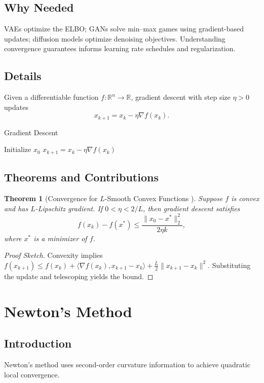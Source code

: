 \documentclass[11pt]{book}
\newtheorem{theorem}{Theorem}[chapter]
\begin{document}
\subsection{Why Needed}
VAEs optimize the ELBO; GANs solve min--max games using gradient-based updates; diffusion models optimize denoising objectives. Understanding convergence guarantees informs learning rate schedules and regularization.

\subsection{Details}
Given a differentiable function $f: \mathbb{R}^n \to \mathbb{R}$, gradient descent with step size $\eta>0$ updates
\begin{equation}
x_{k+1} = x_k - \eta \nabla f(x_k).
\end{equation}

\begin{algorithm}
\caption{Gradient Descent}
\begin{algorithmic}[1]
\STATE Initialize $x_0$
    \STATE $x_{k+1}=x_k-\eta\nabla f(x_k)$
\ENDFOR
\end{algorithmic}
\end{algorithm}

\subsection{Theorems and Contributions}
\begin{theorem}[Convergence for $L$-Smooth Convex Functions \cite{cauchy1847,rockafellar1970}]
Suppose $f$ is convex and has $L$-Lipschitz gradient. If $0<\eta<2/L$, then gradient descent satisfies
\begin{equation}
f(x_k)-f(x^*)\le\frac{\|x_0-x^*\|_2^2}{2\eta k},
\end{equation}
where $x^*$ is a minimizer of $f$.
\end{theorem}
\begin{proof}[Proof Sketch]
Convexity implies $f(x_{k+1})\le f(x_k)+\langle\nabla f(x_k),x_{k+1}-x_k\rangle+\tfrac{L}{2}\|x_{k+1}-x_k\|^2$. Substituting the update and telescoping yields the bound.
\end{proof}

\section{Newton's Method}
\subsection{Introduction}
Newton's method uses second-order curvature information to achieve quadratic local convergence.
\end{document}
